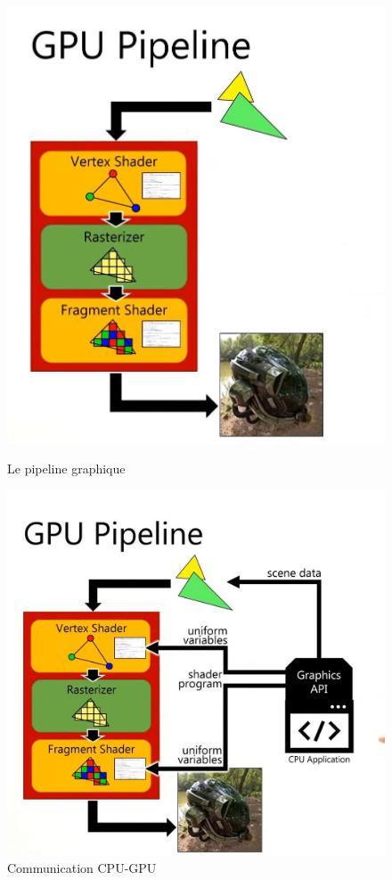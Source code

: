 \begin{figure}[h]
  \begin{minipage}[b]{0.45\linewidth}
    \centering
    \includegraphics[width=0.75\linewidth]{images//shaders/pipeline01.jpg}
    \caption{Le pipeline graphique}
    \label{pipeline01}
  \end{minipage}
  \hspace{0.1\linewidth} %
  \begin{minipage}[b]{0.45\linewidth}
    \centering
    \includegraphics[width=0.75\linewidth]{images//shaders/pipeline02.jpg}
    \caption{Communication CPU-GPU}
    \label{gpu01comm}
  \end{minipage}
\end{figure}






